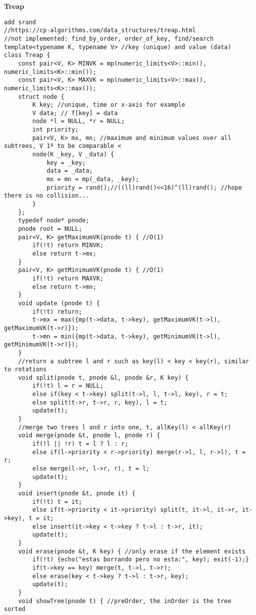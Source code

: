 \documentclass[a4paper,10pt]{article}
\newcommand{\titleAlg}[1]{\vspace{-10pt}
\begin{center}\textbf{#1}\end{center} \vspace{-10pt}}
\begin{document}
\titleAlg{Treap}
\begin{multicols}{2}
\begin{verbatim}
add srand
//https://cp-algorithms.com/data_structures/treap.html
//not implemented: find_by_order, order_of_key, find/search
template<typename K, typename V> //key (unique) and value (data)
class Treap {
    const pair<V, K> MINVK = mp(numeric_limits<V>::min(), numeric_limits<K>::min());
    const pair<V, K> MAXVK = mp(numeric_limits<V>::max(), numeric_limits<K>::max());
    struct node {
        K key; //unique, time or x-axis for example
        V data; // f[key] = data
        node *l = NULL, *r = NULL;
        int priority;
        pair<V, K> mx, mn; //maximum and minimum values over all subtrees, V 1º to be comparable <
        node(K _key, V _data) {
            key = _key;
            data = _data;
            mx = mn = mp(_data, _key);
            priority = rand();//((ll)rand()<<16)^(ll)rand(); //hope there is no collision...
        }
    };
    typedef node* pnode;
    pnode root = NULL;
    pair<V, K> getMaximumVK(pnode t) { //O(1)
        if(!t) return MINVK;
        else return t->mx;
    }
    pair<V, K> getMinimumVK(pnode t) { //O(1)
        if(!t) return MAXVK;
        else return t->mn;
    }
    void update (pnode t) {
        if(!t) return;
        t->mx = max({mp(t->data, t->key), getMaximumVK(t->l), getMaximumVK(t->r)});
        t->mn = min({mp(t->data, t->key), getMinimumVK(t->l), getMinimumVK(t->r)});
    }
    //return a subtree l and r such as key(l) < key < key(r), similar to rotations
    void split(pnode t, pnode &l, pnode &r, K key) {
        if(!t) l = r = NULL;
        else if(key < t->key) split(t->l, l, t->l, key), r = t;
        else split(t->r, t->r, r, key), l = t;
        update(t);
    }
    //merge two trees l and r into one, t, allKey(l) < allKey(r)
    void merge(pnode &t, pnode l, pnode r) {
        if(!l || !r) t = l ? l : r;
        else if(l->priority < r->priority) merge(r->l, l, r->l), t = r;
        else merge(l->r, l->r, r), t = l;
        update(t);
    }
    void insert(pnode &t, pnode it) {
        if(!t) t = it;
        else if(t->priority < it->priority) split(t, it->l, it->r, it->key), t = it;
        else insert(it->key < t->key ? t->l : t->r, it);
        update(t);
    }
    void erase(pnode &t, K key) { //only erase if the element exists
        if(!t) {echo("estas borrando pero no esta:", key); exit(-1);}
        if(t->key == key) merge(t, t->l, t->r);
        else erase(key < t->key ? t->l : t->r, key);
        update(t);
    }
    void showTree(pnode t) { //preOrder, the inOrder is the tree sorted 

\end{verbatim}
\end{multicols}
\end{document}
